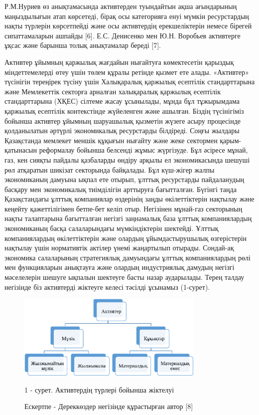 \begin{multicols}{2}
Р.М.Нуриев өз анықтамасында активтерден туындайтын ақша ағындарының
маңыздылығын атап көрсетеді, бірақ осы категорияға енуі мүмкін
ресурстардың нақты түрлерін көрсетпейді және осы активтердің
ерекшеліктерін немесе бірегей сипаттамаларын ашпайды {[}6{]}. Е.С.
Денисенко мен Ю.Н. Воробьев активтерге ұқсас және барынша толық
анықтамалар береді {[}7{]}.

Активтер ұйымның қаржылық жағдайын нығайтуға көмектесетін қарыздық
міндеттемелерді өтеу үшін төлем құралы ретінде қызмет ете алады.
«Активтер» түсінігін тереңірек түсіну үшін Халықаралық қаржылық
есептілік стандарттарына және Мемлекеттік секторға арналған халықаралық
қаржылық есептілік стандарттарына (ХҚЕС) сілтеме жасау ұсынылады, мұнда
бұл тұжырымдама қаржылық есептілік контекстінде жүйеленген және ашылған.
Біздің түсінігіміз бойынша активтер ұйымның шаруашылық қызметін жүзеге
асыру процесінде қолданылатын әртүрлі экономикалық ресурстарды
білдіреді. Соңғы жылдары Қазақстанда мемлекет меншік құқығын нығайту
және жеке сектормен қарым-қатынасын реформалау бойынша белсенді жұмыс
жүргізуде. Бұл әсіресе мұнай, газ, кен сияқты пайдалы қазбаларды өндіру
арқылы ел экономикасында шешуші рөл атқаратын шикізат секторында
байқалады. Бұл күш-жігер жалпы экономиканың дамуына ықпал ете отырып,
ұлттық ресурстарды пайдаланудың басқару мен экономикалық тиімділігін
арттыруға бағытталған. Бүгінгі таңда Қазақстандағы ұлттық компаниялар
өздерінің заңды өкілеттіктерін нақтылау және кеңейту қажеттілігімен
бетпе-бет келіп отыр. Негізінен мұнай-газ секторының нақты талаптарына
бағытталған негізгі заңнамалық база ұлттық компаниялардың экономиканың
басқа салаларындағы мүмкіндіктерін шектейді. Ұлттық компаниялардың
өкілеттіктерін және олардың ұйымдастырушылық өзгерістерін нақтылау үшін
нормативтік актілер үнемі жаңартылып отырады. Сондай-ақ экономика
салаларының стратегиялық дамуындағы ұлттық компаниялардың рөлі мен
функцияларын анықтауға және олардың индустриялық дамудың негізгі
мәселелерін шешуге ықпалын шектеуге басты назар аударылады. Терең талдау
негізінде біз активтерді жіктеуге келесі тәсілді ұсынамыз (1-сурет).
\end{multicols}

\begin{figure}[H]
	\centering
	\includegraphics[width=0.8\textwidth]{media/ekon/image1}
	\caption*{1 - сурет. Активтердің түрлері бойынша жіктелуі}
	\caption*{Ескертпе - Дереккөздер негізінде құрастырған автор {[}8{]}}
\end{figure}


